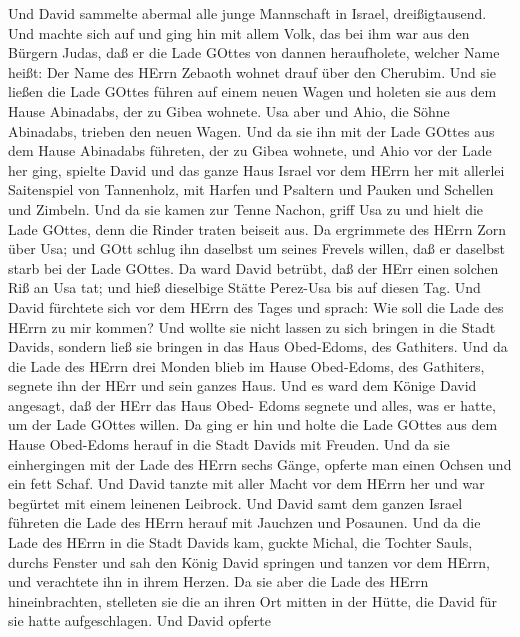  Und David sammelte abermal alle junge Mannschaft in Israel,
dreißigtausend.  Und machte sich auf und ging hin mit allem
Volk, das bei ihm war aus den Bürgern Judas, daß er die Lade GOttes von
dannen heraufholete, welcher Name heißt: Der Name des HErrn Zebaoth
wohnet drauf über den Cherubim.  Und sie ließen die Lade
GOttes führen auf einem neuen Wagen und holeten sie aus dem Hause
Abinadabs, der zu Gibea wohnete. Usa aber und Ahio, die Söhne Abinadabs,
trieben den neuen Wagen.  Und da sie ihn mit der Lade GOttes
aus dem Hause Abinadabs führeten, der zu Gibea wohnete, und Ahio vor der
Lade her ging,  spielte David und das ganze Haus Israel vor
dem HErrn her mit allerlei Saitenspiel von Tannenholz, mit Harfen und
Psaltern und Pauken und Schellen und Zimbeln.  Und da sie
kamen zur Tenne Nachon, griff Usa zu und hielt die Lade GOttes, denn die
Rinder traten beiseit aus.  Da ergrimmete des HErrn Zorn
über Usa; und GOtt schlug ihn daselbst um seines Frevels willen, daß er
daselbst starb bei der Lade GOttes.  Da ward David betrübt,
daß der HErr einen solchen Riß an Usa tat; und hieß dieselbige Stätte
Perez-Usa bis auf diesen Tag.  Und David fürchtete sich vor
dem HErrn des Tages und sprach: Wie soll die Lade des HErrn zu mir
kommen?  Und wollte sie nicht lassen zu sich bringen in die
Stadt Davids, sondern ließ sie bringen in das Haus Obed-Edoms, des
Gathiters.  Und da die Lade des HErrn drei Monden blieb im
Hause Obed-Edoms, des Gathiters, segnete ihn der HErr und sein ganzes
Haus.  Und es ward dem Könige David angesagt, daß der HErr
das Haus Obed- Edoms segnete und alles, was er hatte, um der Lade GOttes
willen. Da ging er hin und holte die Lade GOttes aus dem Hause
Obed-Edoms herauf in die Stadt Davids mit Freuden.  Und da
sie einhergingen mit der Lade des HErrn sechs Gänge, opferte man einen
Ochsen und ein fett Schaf.  Und David tanzte mit aller
Macht vor dem HErrn her und war begürtet mit einem leinenen Leibrock.
 Und David samt dem ganzen Israel führeten die Lade des
HErrn herauf mit Jauchzen und Posaunen.  Und da die Lade
des HErrn in die Stadt Davids kam, guckte Michal, die Tochter Sauls,
durchs Fenster und sah den König David springen und tanzen vor dem
HErrn, und verachtete ihn in ihrem Herzen.  Da sie aber die
Lade des HErrn hineinbrachten, stelleten sie die an ihren Ort mitten in
der Hütte, die David für sie hatte aufgeschlagen. Und David opferte
